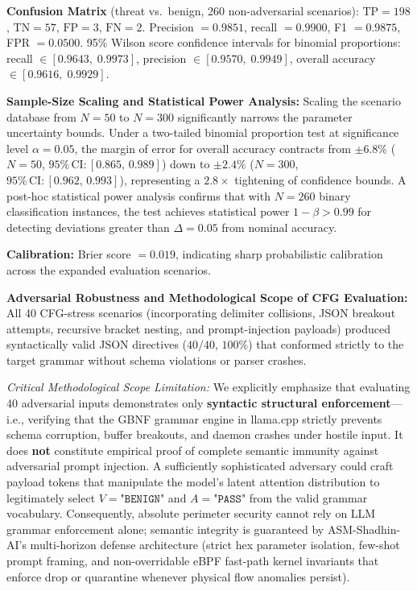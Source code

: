\documentclass{ieeeaccess}
\renewcommand{\_}{\textunderscore\allowbreak}
\begin{document}
\textbf{Confusion Matrix} (threat vs.~benign, 260 non-adversarial scenarios):
$\text{TP}=198$, $\text{TN}=57$, $\text{FP}=3$, $\text{FN}=2$. Precision $= 0.9851$, recall $= 0.9900$, F1 $= 0.9875$,
FPR $= 0.0500$. 95\% Wilson score confidence intervals for binomial proportions: recall $\in [0.9643,\; 0.9973]$,
precision $\in [0.9570,\; 0.9949]$, overall accuracy $\in [0.9616,\; 0.9929]$.

\textbf{Sample-Size Scaling and Statistical Power Analysis:}
Scaling the scenario database from $N=50$ to $N=300$ significantly narrows the parameter uncertainty bounds. Under a two-tailed binomial proportion test at significance level $\alpha = 0.05$, the margin of error for overall accuracy contracts from $\pm 6.8\%$ ($N=50$, $95\%\,\text{CI}: [0.865,\, 0.989]$) down to $\pm 2.4\%$ ($N=300$, $95\%\,\text{CI}: [0.962,\, 0.993]$), representing a $2.8\times$ tightening of confidence bounds. A post-hoc statistical power analysis confirms that with $N=260$ binary classification instances, the test achieves statistical power $1 - \beta > 0.99$ for detecting deviations greater than $\Delta = 0.05$ from nominal accuracy.

\textbf{Calibration:} Brier score $= 0.019$, indicating sharp probabilistic calibration
across the expanded evaluation scenarios.

\textbf{Adversarial Robustness and Methodological Scope of CFG Evaluation:}
All 40 CFG-stress scenarios (incorporating delimiter collisions, JSON breakout attempts, recursive bracket nesting, and prompt-injection payloads) produced syntactically valid JSON directives ($40/40$, $100\%$) that conformed strictly to the target grammar without schema violations or parser crashes.

\textit{Critical Methodological Scope Limitation:} We explicitly emphasize that evaluating 40 adversarial inputs demonstrates only \textbf{syntactic structural enforcement}---i.e., verifying that the GBNF grammar engine in llama.cpp strictly prevents schema corruption, buffer breakouts, and daemon crashes under hostile input. It does \textbf{not} constitute empirical proof of complete semantic immunity against adversarial prompt injection. A sufficiently sophisticated adversary could craft payload tokens that manipulate the model's latent attention distribution to legitimately select $V = \texttt{"BENIGN"}$ and $A = \texttt{"PASS"}$ from the valid grammar vocabulary. Consequently, absolute perimeter security cannot rely on LLM grammar enforcement alone; semantic integrity is guaranteed by ASM-Shadhin-AI's multi-horizon defense architecture (strict hex parameter isolation, few-shot prompt framing, and non-overridable eBPF fast-path kernel invariants that enforce drop or quarantine whenever physical flow anomalies persist).
\end{document}
